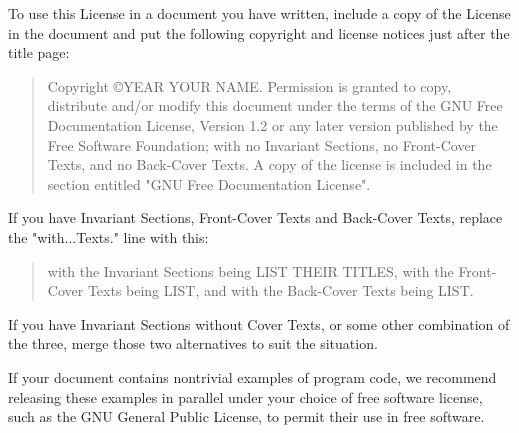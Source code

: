 \documentclass[oneside]{stacks-project-book}
\theoremstyle{plain}
\theoremstyle{definition}
\theoremstyle{remark}
\numberwithin{equation}{subsection}
\begin{document}
To use this License in a document you have written, include a copy of
the License in the document and put the following copyright and
license notices just after the title page:

\bigskip
\begin{quote}
    Copyright \copyright  YEAR  YOUR NAME.
    Permission is granted to copy, distribute and/or modify this document
    under the terms of the GNU Free Documentation License, Version 1.2
    or any later version published by the Free Software Foundation;
    with no Invariant Sections, no Front-Cover Texts, and no Back-Cover Texts.
    A copy of the license is included in the section entitled "GNU
    Free Documentation License".
\end{quote}
\bigskip

If you have Invariant Sections, Front-Cover Texts and Back-Cover Texts,
replace the "with...Texts." line with this:

\bigskip
\begin{quote}
    with the Invariant Sections being LIST THEIR TITLES, with the
    Front-Cover Texts being LIST, and with the Back-Cover Texts being LIST.
\end{quote}
\bigskip

If you have Invariant Sections without Cover Texts, or some other
combination of the three, merge those two alternatives to suit the
situation.

If your document contains nontrivial examples of program code, we
recommend releasing these examples in parallel under your choice of
free software license, such as the GNU General Public License,
to permit their use in free software.
\end{document}
